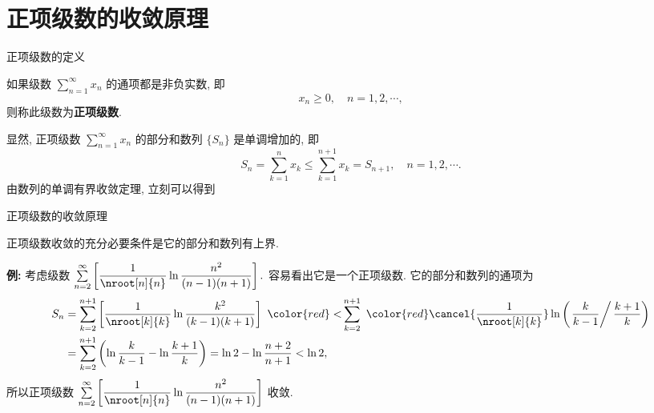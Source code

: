 
\section[收敛原理]{正项级数的收敛原理}


\begin{frame}{正项级数的定义}

\begin{Def}
如果级数 $\sum\limits_{n=1}^\infty x_n$ 的通项都是非负实数, 即
\[x_n \geqslant 0, \quad n = 1, 2, \cdots,\]
则称此级数为\textbf{正项级数}.
\end{Def}

\pause

显然, 正项级数 $\sum\limits_{n=1}^\infty x_n$ 的部分和数列 $\{S_n\}$ 是单调增加的, 即
\[S_n = \sum\limits_{k=1}^n x_k \leqslant \sum\limits_{k=1}^{n+1} x_k = S_{n+1}, \quad n = 1, 2, \cdots.\]
由数列的单调有界收敛定理, 立刻可以得到

\end{frame}


\begin{frame}{正项级数的收敛原理}

\begin{thm}[正项级数的收敛原理]
\begin{center}
正项级数收敛的充分必要条件是它的部分和数列有上界.
\end{center}
\end{thm}

\pause
\vspace*{0.4em}

\textbf{例:} 考虑级数 $\sum\limits_{n=2}^\infty \left[ \dfrac{1}{\nroot[n]{n}} \ln{\dfrac{n^2}{(n-1)(n+1)}} \right].$ 容易看出它是一个正项级数.
\pause
它的部分和数列的通项为
\begin{align*}
S_n & = \sum\limits_{k=2}^{n+1} \left[ \dfrac{1}{\nroot[k]{k}} \ln{\dfrac{k^2}{(k-1)(k+1)}} \right] ~ {\color{red}<} \sum\limits_{k=2}^{n+1} ~ {\color{red}\cancel{\dfrac{1}{\nroot[k]{k}}}} \ln{\left( \left.\dfrac{k}{k-1} \right/ \dfrac{k+1}{k} \right)} \\
& = \sum\limits_{k=2}^{n+1} \left( \ln{\dfrac{k}{k-1}} - \ln{\dfrac{k+1}{k}} \right) = \ln{2} - \ln{\dfrac{n+2}{n+1}} < \ln{2},
\end{align*}
所以正项级数 $\sum\limits_{n=2}^\infty \left[ \dfrac{1}{\nroot[n]{n}} \ln{\dfrac{n^2}{(n-1)(n+1)}} \right]$ 收敛.

\end{frame}

